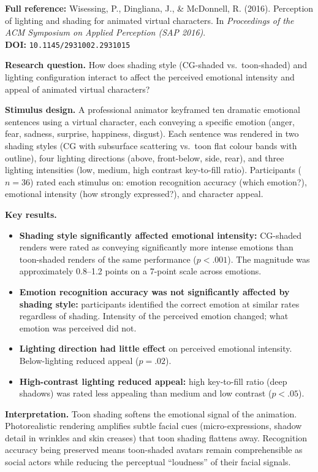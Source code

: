 \documentclass[11pt, a4paper]{article}
\begin{document}
\begin{refbox}
\textbf{Full reference:} Wisessing, P., Dingliana, J., \& McDonnell, R. (2016). Perception of lighting and shading for animated virtual characters. In \textit{Proceedings of the ACM Symposium on Applied Perception (SAP 2016)}.\\[4pt]
\textbf{DOI:} \texttt{10.1145/2931002.2931015}
\end{refbox}

\textbf{Research question.} How does shading style (CG-shaded vs.\ toon-shaded) and lighting configuration interact to affect the perceived emotional intensity and appeal of animated virtual characters?

\textbf{Stimulus design.} A professional animator keyframed ten dramatic emotional sentences using a virtual character, each conveying a specific emotion (anger, fear, sadness, surprise, happiness, disgust). Each sentence was rendered in two shading styles (CG with subsurface scattering vs.\ toon flat colour bands with outline), four lighting directions (above, front-below, side, rear), and three lighting intensities (low, medium, high contrast key-to-fill ratio). Participants ($n = 36$) rated each stimulus on: emotion recognition accuracy (which emotion?), emotional intensity (how strongly expressed?), and character appeal.

\textbf{Key results.}
\begin{itemize}[leftmargin=2em]
  \item \textbf{Shading style significantly affected emotional intensity:} CG-shaded renders were rated as conveying significantly more intense emotions than toon-shaded renders of the same performance ($p < .001$). The magnitude was approximately 0.8--1.2 points on a 7-point scale across emotions.
  \item \textbf{Emotion recognition accuracy was not significantly affected by shading style:} participants identified the correct emotion at similar rates regardless of shading. Intensity of the perceived emotion changed; what emotion was perceived did not.
  \item \textbf{Lighting direction had little effect} on perceived emotional intensity. Below-lighting reduced appeal ($p = .02$).
  \item \textbf{High-contrast lighting reduced appeal:} high key-to-fill ratio (deep shadows) was rated less appealing than medium and low contrast ($p < .05$).
\end{itemize}

\textbf{Interpretation.} Toon shading softens the emotional signal of the animation. Photorealistic rendering amplifies subtle facial cues (micro-expressions, shadow detail in wrinkles and skin creases) that toon shading flattens away. Recognition accuracy being preserved means toon-shaded avatars remain comprehensible as social actors while reducing the perceptual ``loudness'' of their facial signals.
\end{document}
